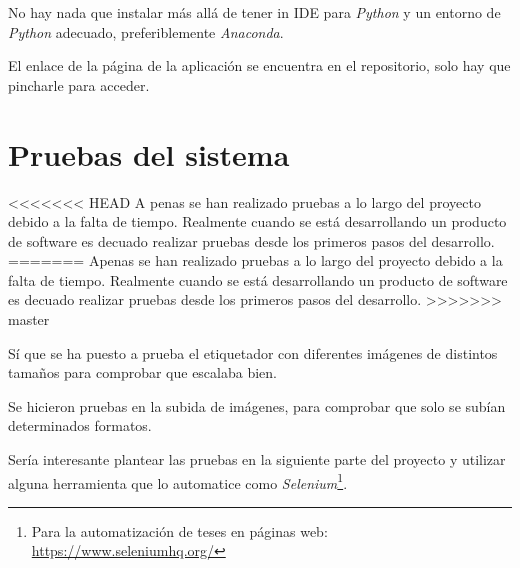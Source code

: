 No hay nada que instalar más allá de tener in IDE para \textit{Python} y un entorno de \textit{Python} adecuado, preferiblemente \textit{Anaconda}.

El enlace de la página de la aplicación se encuentra en el repositorio, solo hay que pincharle para acceder.

\section{Pruebas del sistema}
<<<<<<< HEAD
A penas se han realizado pruebas a lo largo del proyecto debido a la falta de tiempo. Realmente cuando se está desarrollando un producto de software es decuado realizar pruebas desde los primeros pasos del desarrollo.
=======
Apenas se han realizado pruebas a lo largo del proyecto debido a la falta de tiempo. Realmente cuando se está desarrollando un producto de software es decuado realizar pruebas desde los primeros pasos del desarrollo.
>>>>>>> master

Sí que se ha puesto a prueba el etiquetador con diferentes imágenes de distintos tamaños para comprobar que escalaba bien.

Se hicieron pruebas en la subida de imágenes, para comprobar que solo se subían determinados formatos.

Sería interesante plantear las pruebas en la siguiente parte del proyecto y utilizar alguna herramienta que lo automatice como \textit{Selenium}\footnote{Para la automatización de teses en páginas web: \url{https://www.seleniumhq.org/}}.